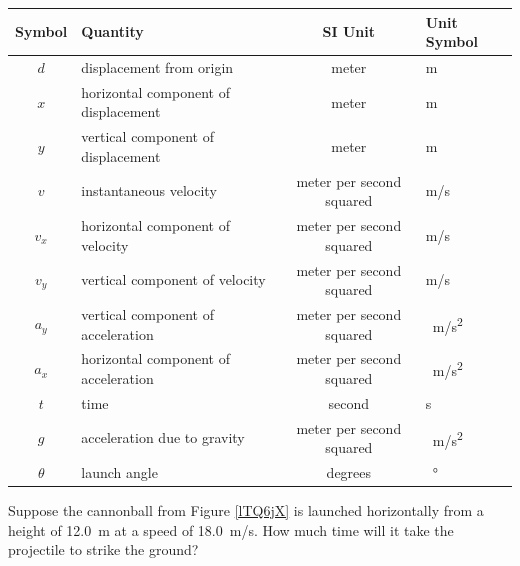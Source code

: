 \documentclass[main-physics.tex]{subfiles}
\begin{document}
\vspace{1ex}

\begin{center}
    \begin{tabular}{cl|cl}
    \hline
    \textbf{Symbol} & \textbf{Quantity} & \textbf{SI Unit} & \textbf{Unit Symbol}  \\
    \hline\hline
        $d$ & displacement from origin & meter & m\\
        $x$ & horizontal component of displacement & meter & m\\
        $y$ & vertical component of displacement & meter & m\\
        $v$ & instantaneous velocity & meter per second squared & m/s\\
        $v_x$ & horizontal component of velocity & meter per second squared & m/s\\
        $v_y$ & vertical component of velocity & meter per second squared & m/s\\
        $a_y$ & vertical component of acceleration & meter per second squared & \SI{}{m/s^2}\\ 
        $a_x$ & horizontal component of acceleration & meter per second squared & \SI{}{m/s^2}\\
        $t$ & time & second & s\\
        $g$ & acceleration due to gravity & meter per second squared & \SI{}{m/s^2}\\
        $\theta$ & launch angle & degrees & \SI{}{\degree}\\
    \hline
    \end{tabular}
\captionsetup{type=table,font=scriptsize}
\label{zvgNdH}
\end{center}




\clearpage


\begin{example} \label{ER19WG}
    Suppose the cannonball from Figure \ref{lTQ6jX} is launched horizontally from a height of \SI{12.0}{m} at a speed of \SI{18.0}{m/s}. How much time will it take the projectile to strike the ground?
\end{example}
\end{document}
